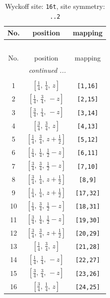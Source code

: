 \documentclass[fleqn,8pt]{jsarticle}
\begin{document}
\renewcommand{\arraystretch}{1.2}
\begin{longtable}{ccc}
\caption{Wyckoff site: {\tt 16t}, site symmetry: {\tt ..2}}
 \\
 \hline \hline
No. & position & mapping \\ \hline \endfirsthead

\multicolumn{2}{l}{\tablename\ \thetable{}} \\
 \hline \hline
No. & position & mapping \\ \hline \endhead

 \hline \hline
\multicolumn{2}{r}{\footnotesize\it continued ...} \\ \endfoot

 \hline \hline
\multicolumn{2}{r}{} \\ \endlastfoot

1 & $\left[ \frac{1}{4},\, \frac{1}{4},\, z \right]$ & {\tt [1,16]} \\ \hline
2 & $\left[ \frac{1}{4},\, \frac{3}{4},\, - z \right]$ & {\tt [2,15]} \\ \hline
3 & $\left[ \frac{3}{4},\, \frac{1}{4},\, - z \right]$ & {\tt [3,14]} \\ \hline
4 & $\left[ \frac{3}{4},\, \frac{3}{4},\, z \right]$ & {\tt [4,13]} \\ \hline
5 & $\left[ \frac{1}{4},\, \frac{3}{4},\, z + \frac{1}{2} \right]$ & {\tt [5,12]} \\ \hline
6 & $\left[ \frac{1}{4},\, \frac{1}{4},\, \frac{1}{2} - z \right]$ & {\tt [6,11]} \\ \hline
7 & $\left[ \frac{3}{4},\, \frac{3}{4},\, \frac{1}{2} - z \right]$ & {\tt [7,10]} \\ \hline
8 & $\left[ \frac{3}{4},\, \frac{1}{4},\, z + \frac{1}{2} \right]$ & {\tt [8,9]} \\ \hline
9 & $\left[ \frac{1}{4},\, \frac{1}{4},\, z + \frac{1}{2} \right]$ & {\tt [17,32]} \\ \hline
10 & $\left[ \frac{1}{4},\, \frac{3}{4},\, \frac{1}{2} - z \right]$ & {\tt [18,31]} \\ \hline
11 & $\left[ \frac{3}{4},\, \frac{1}{4},\, \frac{1}{2} - z \right]$ & {\tt [19,30]} \\ \hline
12 & $\left[ \frac{3}{4},\, \frac{3}{4},\, z + \frac{1}{2} \right]$ & {\tt [20,29]} \\ \hline
13 & $\left[ \frac{1}{4},\, \frac{3}{4},\, z \right]$ & {\tt [21,28]} \\ \hline
14 & $\left[ \frac{1}{4},\, \frac{1}{4},\, - z \right]$ & {\tt [22,27]} \\ \hline
15 & $\left[ \frac{3}{4},\, \frac{3}{4},\, - z \right]$ & {\tt [23,26]} \\ \hline
16 & $\left[ \frac{3}{4},\, \frac{1}{4},\, z \right]$ & {\tt [24,25]} \\
\end{longtable}
\end{document}
